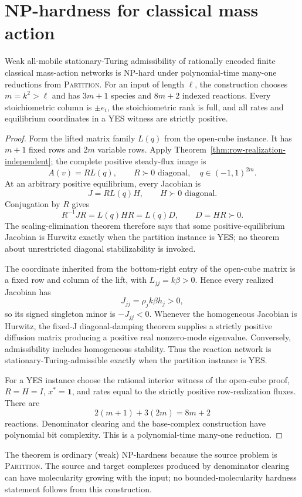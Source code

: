 \section{NP-hardness for classical mass action}
\label{sec:hardness-independent}

\begin{theorem}
\label{thm:hardness-independent}
Weak all-mobile stationary-Turing admissibility of rationally encoded finite
classical mass-action networks is NP-hard under polynomial-time many-one
reductions from \textsc{Partition}. For an input of length $\ell$, the
construction chooses $m=k^2>\ell$ and has $3m+1$ species and $8m+2$ indexed
reactions. Every stoichiometric column is $\pm e_i$, the stoichiometric rank
is full, and all rates and equilibrium coordinates in a YES witness are
strictly positive.
\end{theorem}

\begin{proof}
Form the lifted matrix family $L(q)$ from the open-cube instance. It has
$m+1$ fixed rows and $2m$ variable rows. Apply
Theorem~\ref{thm:row-realization-independent}; the complete positive
steady-flux image is
\[
 A(v)=R L(q),\qquad R\succ0\text{ diagonal},\quad q\in(-1,1)^{2m}.
\]
At an arbitrary positive equilibrium, every Jacobian is
\[
 J=R L(q)H,
 \qquad H\succ0\text{ diagonal}.
\]
Conjugation by $R$ gives
\[
 R^{-1}JR=L(q)HR=L(q)D,
 \qquad D=HR\succ0.
\]
The scaling-elimination theorem therefore says that some positive-equilibrium
Jacobian is Hurwitz exactly when the partition instance is YES; no theorem
about unrestricted diagonal stabilizability is invoked.

The coordinate inherited from the bottom-right entry of the open-cube matrix
is a fixed row and column of the lift, with $L_{jj}=k\beta>0$. Hence every
realized Jacobian has
\[
 J_{jj}=\rho_jk\beta h_j>0,
\]
so its signed singleton minor is $-J_{jj}<0$. Whenever the homogeneous
Jacobian is Hurwitz, the fixed-J diagonal-damping theorem supplies a strictly
positive diffusion matrix producing a positive real nonzero-mode eigenvalue.
Conversely, admissibility includes homogeneous stability. Thus the reaction
network is stationary-Turing-admissible exactly when the partition instance
is YES.

For a YES instance choose the rational interior witness of the open-cube
proof, $R=H=I$, $x^*=\mathbf1$, and rates equal to the strictly positive
row-realization fluxes. There are
\[
 2(m+1)+3(2m)=8m+2
\]
reactions. Denominator clearing and the base-complex construction have
polynomial bit complexity. This is a polynomial-time many-one reduction.
\end{proof}

The theorem is ordinary (weak) NP-hardness because the source problem is
\textsc{Partition}. The source and target complexes produced by denominator
clearing can have molecularity growing with the input; no bounded-molecularity
hardness statement follows from this construction.
